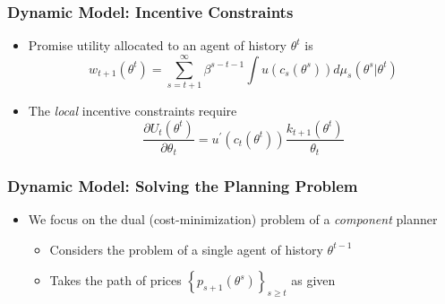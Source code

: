 \documentclass{beamer}
\begin{document}
\begin{frame}
    \frametitle{Dynamic Model: Incentive Constraints}

    \begin{itemize}
        \item Promise utility allocated to an agent of history $\theta^{t}$ is
        \begin{equation*}
        w_{t+1}\left(\theta^{t}\right)=\sum_{s=t+1}^{\infty}\beta^{s-t-1}\int u\left(c_{s}\left(\theta^{s}\right)\right)d\mu_{s}\left(\theta^{s}\big|\theta^{t}\right)
        \end{equation*} 
        \item The \textit{local} incentive constraints require 
        \begin{equation*}
            \frac{\partial U_t \left( \theta^t \right)}{\partial \theta_t}=u^{\prime}\left(c_{t}\left(\theta^{t}\right)\right)\frac{k_{t+1}\left(\theta^{t}\right)}{\theta_{t}}
        \end{equation*}
    \end{itemize}

\end{frame}

\begin{frame}
    \frametitle{Dynamic Model: Solving the Planning Problem}

    \begin{itemize}
        \item We focus on the dual (cost-minimization) problem of a \textit{component} planner 
        \begin{itemize}
            \item Considers the problem of a single agent of history \( \theta^{t-1} \)
            \item Takes the path of prices \( \left\{ p_{s+1}\left( \theta^s \right) \right\}_{s\ge t} \) as given 
        \end{itemize}
    \end{itemize}

\end{frame}

    
\end{document}
